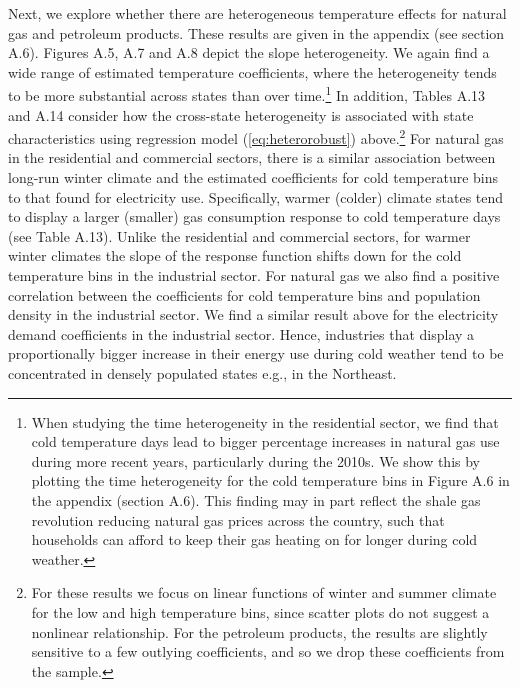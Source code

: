 \documentclass[11pt]{article}
\begin{document}
Next, we explore whether there are heterogeneous temperature effects for natural gas and petroleum products. These results are given in the appendix (see section A.6). Figures A.5, A.7 and A.8 depict the slope heterogeneity. We again find a wide range of estimated temperature coefficients, where the heterogeneity tends to be more substantial across states than over time.\footnote{ When studying the time heterogeneity in the residential sector, we find that cold temperature days lead to bigger percentage increases in natural gas use during more recent years, particularly during the 2010s. We show this by plotting the time heterogeneity for the cold temperature bins in Figure A.6 in the appendix (section A.6). This finding may in part reflect the shale gas revolution reducing natural gas prices across the country, such that households can afford to keep their gas heating on for longer during cold weather.} In addition, Tables A.13 and A.14 consider how the cross-state heterogeneity is associated with state characteristics using regression model (\ref{eq:heterorobust}) above.\footnote{For these results we focus on linear functions of winter and summer climate for the low and high temperature bins, since scatter plots do not suggest a nonlinear relationship. For the petroleum products, the results are slightly sensitive to a few outlying coefficients, and so we drop these coefficients from the sample.} For natural gas in the residential and commercial sectors, there is a similar association between long-run winter climate and the estimated coefficients for cold temperature bins to that found for electricity use. Specifically, warmer (colder) climate states tend to display a larger (smaller) gas consumption response to cold temperature days (see Table A.13). Unlike the residential and commercial sectors, for warmer winter climates the slope of the response function shifts down for the cold temperature bins in the industrial sector. For natural gas we also find a positive correlation between the coefficients for cold temperature bins and population density in the industrial sector. We find a similar result above for the electricity demand coefficients in the industrial sector. Hence, industries that display a proportionally bigger increase in their energy use during cold weather tend to be concentrated in densely populated states e.g., in the Northeast.
\end{document}
